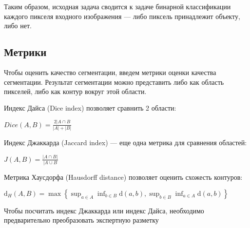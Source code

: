 Таким образом, исходная задача сводится к задаче бинарной классификации каждого пикселя входного изображения — либо пиксель принадлежит объекту, либо нет.

\subsection{Метрики}

Чтобы оценить качество сегментации, введем метрики оценки качества сегментации. Результат сегментации можно представить либо как область пикселей, либо как контур вокруг этой области. 

Индекс Дайса (Dice index) позволяет сравнить 2 области:

$Dice(A,B) = \frac{2|A\cap{}B}{|A| + |B|}$

Индекс Джаккарда (Jaccard index) — еще одна метрика для сравнения областей:

$J(A,B) = \frac{|A\cap{}B|}{|A\cup{}B}$

Метрика Хаусдорфа (Hausdorff distance) позволяет оценить схожесть контуров:

$\mathrm{d}_{H}(A,B)=\max\left\{\sup_{a\in{}A}\inf_{b\in{}B}\mathrm{d}(a,b),\sup_{b\in{}B}\inf_{a\in{}A}\mathrm{d}(a,b)\right\}$

Чтобы посчитать индекс Джаккарда или индекс Дайса, необходимо предварительно преобразовать экспертную разметку


